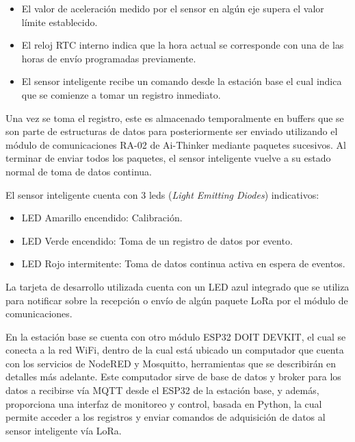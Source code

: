 \begin{itemize}
    \item El valor de aceleración medido por el sensor en algún eje supera el valor límite establecido.
    \item El reloj RTC interno indica que la hora actual se corresponde con una de las horas de envío programadas previamente.
    \item El sensor inteligente recibe un comando desde la estación base el cual indica que se comienze a tomar un registro inmediato.
\end{itemize}

Una vez se toma el registro, este es almacenado temporalmente en buffers que se son parte de estructuras de datos para posteriormente ser enviado utilizando el módulo de comunicaciones RA-02 de Ai-Thinker mediante paquetes sucesivos. Al terminar de enviar todos los paquetes, el sensor inteligente vuelve a su estado normal de toma de datos continua.

El sensor inteligente cuenta con 3 leds (\textit{Light Emitting Diodes}) indicativos:

\begin{itemize}
    \item LED Amarillo encendido: Calibración.
    \item LED Verde encendido: Toma de un registro de datos por evento.
    \item LED Rojo intermitente: Toma de datos continua activa en espera de eventos.
\end{itemize}

La tarjeta de desarrollo utilizada cuenta con un LED azul integrado que se utiliza para notificar sobre la recepción o envío de algún paquete LoRa por el módulo de comunicaciones.

En la estación base se cuenta con otro módulo ESP32 DOIT DEVKIT, el cual se conecta a la red WiFi, dentro de la cual está ubicado un computador que cuenta con los servicios de NodeRED y Mosquitto, herramientas que se describirán en detalles más adelante. Este computador sirve de base de datos y broker para los datos a recibirse vía MQTT desde el ESP32 de la estación base, y además, proporciona una interfaz de monitoreo y control, basada en Python, la cual permite acceder a los registros y enviar comandos de adquisición de datos al sensor inteligente vía LoRa. 

